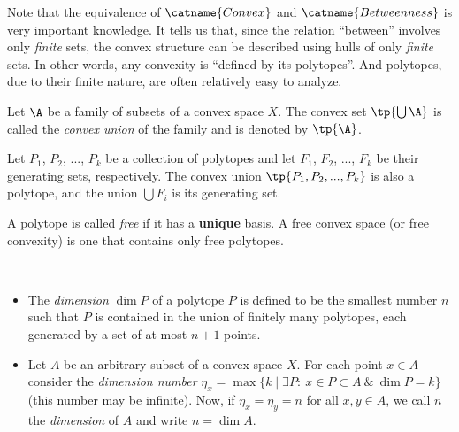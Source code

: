 \documentclass[12pt, a4paper]{article}
\begin{document}
Note that the equivalence of \(\catname{Convex}\) and \(\catname{Betweenness}\) is very important knowledge. It tells us that, since the relation ``between'' involves only \textit{finite} sets, the convex structure can be described using hulls of only \textit{finite} sets. In other words, any convexity is ``defined by its polytopes''. And polytopes, due to their finite nature, are often relatively easy to analyze.

\begin{definition}
    Let \(\A\) be a family of subsets of a convex space \(X\). The convex set \(\tp{\bigcup \A}\) is called the \textit{convex union} of the family and is denoted by \(\tp{\A}\).
\end{definition}

\begin{remark}
    Let \(P_1\), \(P_2\), ..., \(P_k\) be a collection of polytopes and let \(F_1\), \(F_2\), ..., \(F_k\) be their generating sets, respectively. The convex union \(\tp{P_1, P_2, ..., P_k}\) is also a polytope, and the union \(\bigcup F_i\) is its generating set.
\end{remark}

\begin{definition}\label{def-free}
    A polytope is called \textit{free} if it has a \textbf{unique} basis. A free convex space (or free convexity) is one that contains only free polytopes.
\end{definition}

\begin{definition}[Dimension]\label{def-dim}~
    \begin{itemize}
        \item The \textit{dimension} \(\dim{P}\) of a polytope \(P\) is defined to be the smallest number \(n\) such that \(P\) is contained in the union of finitely many polytopes, each generated by a set of at most \(n+1\) points.
        
        \item Let \(A\) be an arbitrary subset of a convex space \(X\). For each point \(x \in A\) consider the \textit{dimension number} \(\eta_x = \max \{k \mid \exists P : \ x \in P \subset A \ \& \ \dim{P} = k\}\) (this number may be infinite). Now, if \(\eta_x = \eta_y = n\) for all \(x, y \in A\), we call \(n\) the \textit{dimension} of \(A\) and write \(n = \dim A\).
    \end{itemize}
\end{definition}
\end{document}
